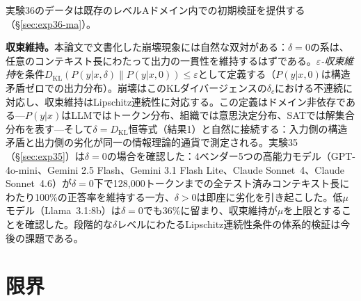 \documentclass[11pt,a4paper]{article}
\begin{document}
実験36のデータは既存のレベルAドメイン内での初期検証を提供する（\S\ref{sec:exp36-ma}）。

\textbf{収束維持。}本論文で文書化した崩壊現象には自然な双対がある：$\delta = 0$の系は、任意のコンテキスト長にわたって出力の一貫性を維持するはずである。\emph{$\varepsilon$-収束維持}を条件$D_{\text{KL}}(P(y|x, \delta) \| P(y|x, 0)) \leq \varepsilon$として定義する（$P(y|x, 0)$は構造矛盾ゼロでの出力分布）。崩壊はこのKLダイバージェンスの$\delta_c$における不連続に対応し、収束維持はLipschitz連続性に対応する。この定義はドメイン非依存である---$P(y|x)$はLLMではトークン分布、組織では意思決定分布、SATでは解集合分布を表す---そして$\delta = D_{\text{KL}}$恒等式（結果1）と自然に接続する：入力側の構造矛盾と出力側の劣化が同一の情報理論的通貨で測定される。実験35（\S\ref{sec:exp35}）は$\delta = 0$の場合を確認した：4ベンダー5つの高能力モデル（GPT-4o-mini、Gemini 2.5 Flash、Gemini 3.1 Flash Lite、Claude Sonnet~4、Claude Sonnet~4.6）が$\delta = 0$下で128{,}000トークンまでの全テスト済みコンテキスト長にわたり100\%の正答率を維持する一方、$\delta > 0$は即座に劣化を引き起こした。低$\mu$モデル（Llama~3.1:8b）は$\delta = 0$でも36\%に留まり、収束維持が$\mu$を上限とすることを確認した。段階的な$\delta$レベルにわたるLipschitz連続性条件の体系的検証は今後の課題である。

\section{限界}
\label{sec:limitations}
\end{document}
